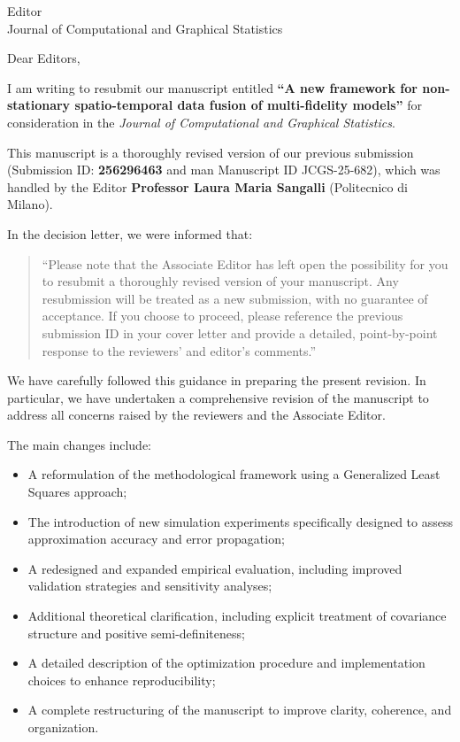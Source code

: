\documentclass[11pt]{letter}
\begin{document}
\begin{letter}{Editor\\
Journal of Computational and Graphical Statistics}

\opening{Dear Editors,}

I am writing to resubmit our manuscript entitled \textbf{“A new framework for non-stationary spatio-temporal data fusion of multi-fidelity models”} for consideration in the \textit{Journal of Computational and Graphical Statistics}.

This manuscript is a thoroughly revised version of our previous submission (Submission ID: \textbf{256296463} and man Manuscript ID JCGS-25-682), which was handled by the Editor \textbf{Professor Laura Maria Sangalli} (Politecnico di Milano).

In the decision letter, we were informed that:

\begin{quote}
“Please note that the Associate Editor has left open the possibility for you to resubmit a thoroughly revised version of your manuscript. Any resubmission will be treated as a new submission, with no guarantee of acceptance. If you choose to proceed, please reference the previous submission ID in your cover letter and provide a detailed, point-by-point response to the reviewers' and editor's comments.”
\end{quote}

We have carefully followed this guidance in preparing the present revision. In particular, we have undertaken a comprehensive revision of the manuscript to address all concerns raised by the reviewers and the Associate Editor.

The main changes include:

\begin{itemize}
\item A reformulation of the methodological framework using a Generalized Least Squares approach;
\item The introduction of new simulation experiments specifically designed to assess approximation accuracy and error propagation;
\item A redesigned and expanded empirical evaluation, including improved validation strategies and sensitivity analyses;
\item Additional theoretical clarification, including explicit treatment of covariance structure and positive semi-definiteness;
\item A detailed description of the optimization procedure and implementation choices to enhance reproducibility;
\item A complete restructuring of the manuscript to improve clarity, coherence, and organization.
\end{itemize}


\end{letter}
\end{document}
